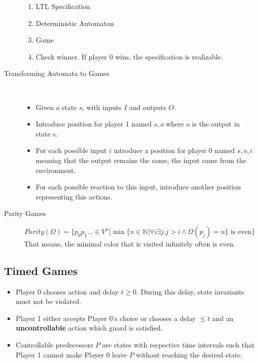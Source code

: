 \begin{description}
\begin{enumerate}
		\item LTL Specification
		\item Deterministic Automaton
		\item Game
		\item Check winner. If player 0 wins, the specification is realizable.
	\end{enumerate}
	\item[Transforming Automata to Games] \ 
	\begin{itemize}
		\item Given a state $s$, with inputs $I$ and outputs $O$. 
		\item Introduce position for player 1 named $s, o$ where o is the output in state s. 
		\item For each possible input $i$ introduce a position for player 0 named $s, o, i$ meaning that the output remains the same, the input came from the environment. 
		\item For each possible reaction to this input, introduce another position representing this actions.
	\end{itemize}
	\item[Parity Games] 
	\[ \textit{Parity}(\Omega) = \{ p_0p_1\ldots \in V^\omega | \min\{ n \in \mathds{N} | \forall i \exists j. j>i \land \Omega(p_j) = n \} \text{ is even} \} \] 
	That means, the minimal color that is visited infinitely often is even.
\end{description}

\subsection{Timed Games}

\begin{itemize}
	\item Player 0 chooses action and delay $t \geq 0$. During this delay, state invariants must not be violated.
	\item Player 1 either accepts Player 0's choice or chooses a delay $\leq t$ and an \textbf{uncontrollable} action which guard is satisfied.
	\item Controllable predecessors $P$ are states with respective time intervals such that Player 1 cannot make Player 0 leave $P$ without reaching the desired state.
\end{itemize}

